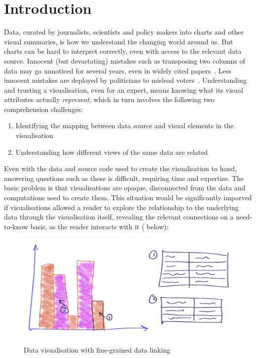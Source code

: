 \section{Introduction}

Data, curated by journalists, scientists and policy makers into charts and other visual summaries, is how we understand the changing world around us. But charts can be hard to interpret correctly, even with access to the relevant data source. Innocent (but devastating) mistakes such as transposing two columns of data may go unnoticed for several years, even in widely cited papers~\cite{miller06}. Less innocent mistakes are deployed by politicians to mislead voters~\cite{fullfact19}. Understanding and trusting a visualisation, even for an expert, means knowing what its visual attributes actually \emph{represent}, which in turn involves the following two comprehension challenges:

\begin{enumerate}
  \item Identifying the mapping between data source and visual elements in the visualisation
  \item Understanding how different views of the same data are related
\end{enumerate}

\noindent Even with the data and source code used to create the visualisation to hand, answering questions such as these is difficult, requiring time and expertise. The basic problem is that visualisations are opaque, disconnected from the data and computations used to create them. This situation would be significantly imporved if visualisations allowed a reader to explore the relationship to the underlying data through the visualisation itself, revealing the relevant connections on a need-to-know basis, as the reader interacts with it ( below):

\begin{figure}[H]
   {\includegraphics[scale=0.07]{fig/example/data-linking.png}}
   \caption{Data visualisation with fine-grained data linking}
   \label{fig:introduction:data-linking}
\end{figure}

